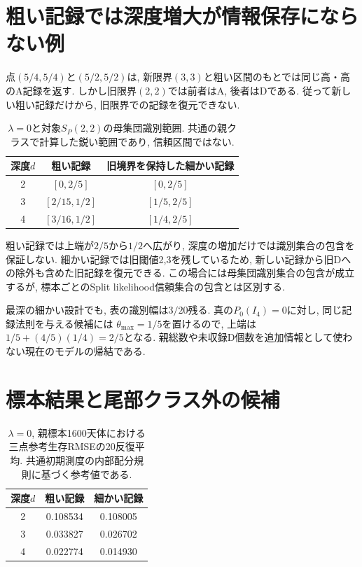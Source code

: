 \section{粗い記録では深度増大が情報保存にならない例}
\label{sec:stage23_information_loss}

点$(5/4,5/4)$と$(5/2,5/2)$は,
新限界$(3,3)$と粗い区間のもとでは同じ高・高のA記録を返す.
しかし旧限界$(2,2)$では前者はA, 後者はDである.
従って新しい粗い記録だけから, 旧限界での記録を復元できない.

\begin{table}[htbp]
\centering
\caption{$\lambda=0$と対象$S_P(2,2)$の母集団識別範囲.
共通の親クラスで計算した鋭い範囲であり, 信頼区間ではない.}
\label{tab:stage23_population_ranges}
\begin{tabular}{ccc}
\toprule
深度$d$ & 粗い記録 & 旧境界を保持した細かい記録 \\
\midrule
2 & $[0,2/5]$ & $[0,2/5]$ \\
3 & $[2/15,1/2]$ & $[1/5,2/5]$ \\
4 & $[3/16,1/2]$ & $[1/4,2/5]$ \\
\bottomrule
\end{tabular}
\end{table}

粗い記録では上端が$2/5$から$1/2$へ広がり,
深度の増加だけでは識別集合の包含を保証しない.
細かい記録では旧閾値2,3を残しているため,
新しい記録から旧Dへの除外も含めた旧記録を復元できる.
この場合には母集団識別集合の包含が成立するが,
標本ごとのSplit likelihood信頼集合の包含とは区別する.

最深の細かい設計でも, 表の識別幅は$3/20$残る.
真の$P_0(I_4)=0$に対し, 同じ記録法則を与える候補には
$\theta_{\max}=1/5$を置けるので,
上端は$1/5+(4/5)(1/4)=2/5$となる.
親総数や未収録D個数を追加情報として使わない現在のモデルの帰結である.

\section{標本結果と尾部クラス外の候補}
\label{sec:stage23_results}

\begin{table}[htbp]
\centering
\caption{$\lambda=0$, 親標本1600天体における三点参考生存RMSEの20反復平均.
共通初期測度の内部配分規則に基づく参考値である.}
\label{tab:stage23_reference_rmse}
\begin{tabular}{ccc}
\toprule
深度$d$ & 粗い記録 & 細かい記録 \\
\midrule
2 & 0.108534 & 0.108005 \\
3 & 0.033827 & 0.026702 \\
4 & 0.022774 & 0.014930 \\
\bottomrule
\end{tabular}
\end{table}

